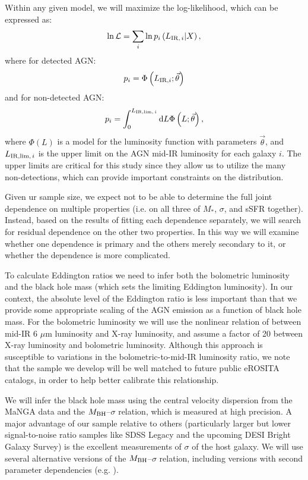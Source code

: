 \documentclass[12pt, preprint]{hacked-aastex}
\begin{document}
Within any given model, we will maximize the log-likelihood, which can
be expressed as:
\begin{equation}
\ln \mathcal{L} = \sum_i \ln p_i\left(L_{{\rm IR},\,i}  | X\right),
\end{equation}
where for detected AGN:
\begin{equation}
p_i = \Phi\left(L_{{\rm IR}, i}; \vec{\theta} \right)
\end{equation}
and for non-detected AGN:
\begin{equation}
p_i = \int_0^{L_{{\rm IR, lim},\,i}} {\rm d}L \Phi\left(L; \vec{\theta}\right),
\end{equation}
where $\Phi(L)$ is a model for the luminosity function with
parameters $\vec{\theta}$, and $L_{{\rm IR, lim},\,i}$ is the upper limit 
on the AGN mid-IR luminosity for each galaxy $i$.
The upper limits are critical for this study since they allow
us to utilize the many non-detections, which can provide important
constraints on the distribution.

Given ur sample size, we expect not to be able to determine the full
joint dependence on multiple properties (i.e. on all three of
$M_\ast$, $\sigma$, and sSFR together). Instead, based on the results
of fitting each dependence separately, we will search for residual
dependence on the other two properties. In this way we will examine
whether one dependence is primary and the others merely secondary to
it, or whether the dependence is more complicated.

To calculate Eddington ratios we need to infer both the bolometric
luminosity and the black hole mass (which sets the limiting Eddington
luminosity). In our context, the absolute level of the Eddington ratio
is less important than that we provide some appropriate scaling of the
AGN emission as a function of black hole mass.  For the bolometric
luminosity we will use the nonlinear relation of \cite{stern15a}
between mid-IR 6 $\mu$m luminosity and X-ray luminosity, and assume a
factor of 20 between X-ray luminosity and bolometric
luminosity. Although this approach is susceptible to variations in the
bolometric-to-mid-IR luminosity ratio, we note that the sample we
develop will be well matched to future public eROSITA catalogs, in
order to help better calibrate this relationship.

We will infer the black hole mass using the central velocity
dispersion from the MaNGA data and the $M_{\rm BH}$--$\sigma$
relation, which is measured at high precision.  A major advantage of
our sample relative to others (particularly larger but lower
signal-to-noise ratio samples like SDSS Legacy and the upcoming DESI
Bright Galaxy Survey) is the excellent measurements of $\sigma$ of the
host galaxy. We will use several alternative versions of the $M_{\rm
  BH}$--$\sigma$ relation, including versions with second parameter
dependencies (e.g. \cite{beifiori12a, kormendy13a, vandenbosch16a, shankar19a}).
\end{document}

